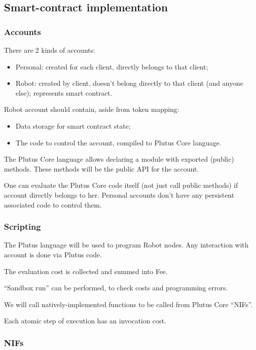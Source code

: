 \subsection{Smart-contract implementation}
\label{apx:smart-contracts}

\subsubsection{Accounts}

There are 2 kinds of accounts:
\begin{itemize}
  \item Personal: created for each client, directly belongs to that client;
  \item Robot: created by client, doesn't belong directly to that client (and anyone else); represents smart contract.
\end{itemize}

Robot account should contain, aside from token mapping:
\begin{itemize}
  \item Data storage for smart contract state;
  \item The code to control the account, compiled to Plutus Core language.
\end{itemize}

The Plutus Core language allows declaring a module with exported (public) methods.
These methods will be the public API for the account.

One can evaluate the Plutus Core code itself (not just call public methods) if account directly belongs to her.
Personal accounts don't have any persistent associated code to control them.

\subsubsection{Scripting}

The Plutus language will be used to program Robot nodes.
Any interaction with account is done via Plutus code.

The evaluation cost is collected and summed into Fee.

``Sandbox run'' can be performed, to check costs and programming errors.

We will call natively-implemented functions to be called from Plutus Core ``NIFs''.

Each atomic step of execution has an invocation cost.

\subsubsection{NIFs}

